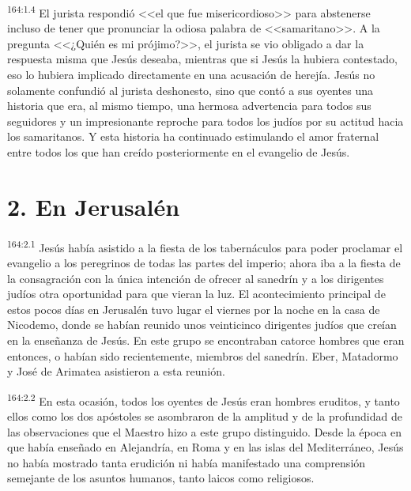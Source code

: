\par 
\textsuperscript{164:1.4} El jurista respondió <<el que fue misericordioso>> para abstenerse incluso de tener que pronunciar la odiosa palabra de <<samaritano>>. A la pregunta <<¿Quién es mi prójimo?>>, el jurista se vio obligado a dar la respuesta misma que Jesús deseaba, mientras que si Jesús la hubiera contestado, eso lo hubiera implicado directamente en una acusación de herejía. Jesús no solamente confundió al jurista deshonesto, sino que contó a sus oyentes una historia que era, al mismo tiempo, una hermosa advertencia para todos sus seguidores y un impresionante reproche para todos los judíos por su actitud hacia los samaritanos. Y esta historia ha continuado estimulando el amor fraternal entre todos los que han creído posteriormente en el evangelio de Jesús.

\section*{2. En Jerusalén}
\par 
\textsuperscript{164:2.1} Jesús había asistido a la fiesta de los tabernáculos para poder proclamar el evangelio a los peregrinos de todas las partes del imperio; ahora iba a la fiesta de la consagración con la única intención de ofrecer al sanedrín y a los dirigentes judíos otra oportunidad para que vieran la luz. El acontecimiento principal de estos pocos días en Jerusalén tuvo lugar el viernes por la noche en la casa de Nicodemo, donde se habían reunido unos veinticinco dirigentes judíos que creían en la enseñanza de Jesús. En este grupo se encontraban catorce hombres que eran entonces, o habían sido recientemente, miembros del sanedrín. Eber, Matadormo y José de Arimatea asistieron a esta reunión.

\par 
\textsuperscript{164:2.2} En esta ocasión, todos los oyentes de Jesús eran hombres eruditos, y tanto ellos como los dos apóstoles se asombraron de la amplitud y de la profundidad de las observaciones que el Maestro hizo a este grupo distinguido. Desde la época en que había enseñado en Alejandría, en Roma y en las islas del Mediterráneo, Jesús no había mostrado tanta erudición ni había manifestado una comprensión semejante de los asuntos humanos, tanto laicos como religiosos.

